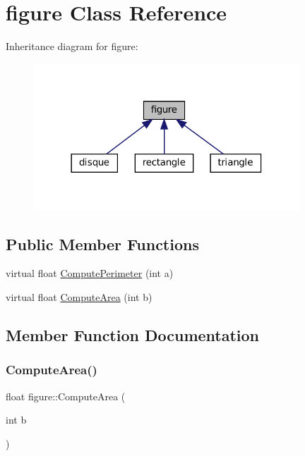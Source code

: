 \hypertarget{classfigure}{}\section{figure Class Reference}
\label{classfigure}


Inheritance diagram for figure\+:
\nopagebreak
\begin{figure}[H]
\begin{center}
\leavevmode
\includegraphics[width=282pt]{classfigure__inherit__graph}
\end{center}
\end{figure}
\subsection*{Public Member Functions}
\begin{DoxyCompactItemize}
\item 
virtual float \hyperlink{classfigure_ace592f5ccc0020afb1bee680b6806427}{Compute\+Perimeter} (int a)
\item 
virtual float \hyperlink{classfigure_a92c8c288812286ea31f401eb410146d9}{Compute\+Area} (int b)
\end{DoxyCompactItemize}


\subsection{Member Function Documentation}
\mbox{\label{classfigure_a92c8c288812286ea31f401eb410146d9}} 
\subsubsection{\texorpdfstring{Compute\+Area()}{ComputeArea()}}
{\footnotesize\ttfamily float figure\+::\+Compute\+Area (\begin{DoxyParamCaption}\item[{int}]{b }\end{DoxyParamCaption})\hspace{0.3cm}{\ttfamily [virtual]}}


